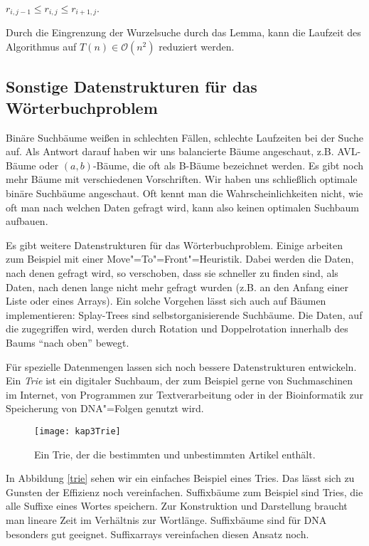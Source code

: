 \begin{Lma}
  \hspace{\parindent}$r_{i,j-1} \le r_{i,j} \le r_{i+1, j}$.
\end{Lma}

Durch die Eingrenzung der Wurzelsuche durch das Lemma, kann die Laufzeit des Algorithmus auf $T(n) \in \mathcal{O}(n^2)$ reduziert werden.

\subsection{Sonstige Datenstrukturen für das Wörterbuchproblem}
Binäre Suchbäume weißen in schlechten Fällen, schlechte Laufzeiten bei der Suche auf. Als Antwort darauf haben wir uns balancierte Bäume angeschaut, z.B. AVL-Bäume oder $(a,b)$-Bäume, die oft als B-Bäume bezeichnet werden. Es gibt noch mehr Bäume mit verschiedenen Vorschriften. Wir haben uns schließlich optimale binäre Suchbäume angeschaut. Oft kennt man die Wahrscheinlichkeiten nicht, wie oft man nach welchen Daten gefragt wird, kann also keinen optimalen Suchbaum aufbauen.

Es gibt weitere Datenstrukturen für das Wörterbuchproblem. Einige arbeiten zum Beispiel mit einer Move"=To"=Front"=Heuristik. Dabei werden die Daten, nach denen gefragt wird, so verschoben, dass sie schneller zu finden sind, als Daten, nach denen lange nicht mehr gefragt wurden (z.B. an den Anfang einer Liste oder eines Arrays). Ein solche Vorgehen lässt sich auch auf Bäumen implementieren: Splay-Trees sind selbstorganisierende Suchbäume. Die Daten, auf die zugegriffen wird, werden durch Rotation und Doppelrotation innerhalb des Baums "`nach oben"' bewegt.

Für spezielle Datenmengen lassen sich noch bessere Datenstrukturen entwickeln. Ein \textit{Trie} ist ein digitaler Suchbaum, der zum Beispiel gerne von Suchmaschinen im Internet, von Programmen zur Textverarbeitung oder in der Bioinformatik zur Speicherung von DNA"=Folgen genutzt wird.

\begin{figure}[hbt]
  \centering
  \texttt{[image: kap3Trie]}
  \caption{Ein Trie, der die bestimmten und unbestimmten Artikel enthält.}
  \label{trie}
\end{figure}

In Abbildung \vref{trie} sehen wir ein einfaches Beispiel eines Tries. Das lässt sich zu Gunsten der Effizienz noch vereinfachen. Suffixbäume zum Beispiel sind Tries, die alle Suffixe eines Wortes speichern. Zur Konstruktion und Darstellung braucht man lineare Zeit im Verhältnis zur Wortlänge. Suffixbäume sind für DNA besonders gut geeignet. Suffixarrays vereinfachen diesen Ansatz noch.

